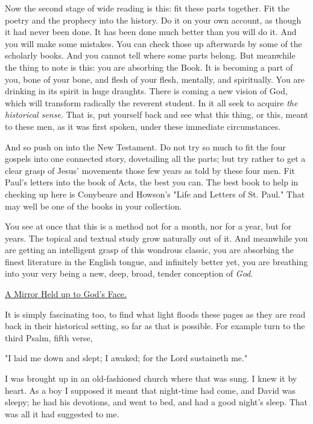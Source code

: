 Now the second stage of wide reading is this: fit these parts together.
Fit the poetry and the prophecy into the history. Do it on your own
account, as though it had never been done. It has been done much better
than you will do it. And you will make some mistakes. You can check those
up afterwards by some of the scholarly books. And you cannot tell where
some parts belong. But meanwhile the thing to note is this: you are
absorbing the Book. It is becoming a part of you, bone of your bone, and
flesh of your flesh, mentally, and spiritually. You are drinking in its
spirit in huge draughts. There is coming a new vision of God, which will
transform radically the reverent student. In it all seek to acquire \textit{the
historical sense}. That is, put yourself back and see what this thing, or
this, meant to these men, as it was first spoken, under these immediate
circumstances.

And so push on into the New Testament. Do not try so much to fit the four
gospels into one connected story, dovetailing all the parts; but try
rather to get a clear grasp of Jesus' movements those few years as told by
these four men. Fit Paul's letters into the book of Acts, the best you
can. The best book to help in checking up here is Conybeare and Howson's
"Life and Letters of St. Paul." That may well be one of the books in your
collection.

You see at once that this is a method not for a month, nor for a year, but
for years. The topical and textual study grow naturally out of it. And
meanwhile you are getting an intelligent grasp of this wondrous classic,
you are absorbing the finest literature in the English tongue, and
infinitely better yet, you are breathing into your very being a new, deep,
broad, tender conception of \textit{God}.



\underline{A Mirror Held up to God's Face.}


It is simply fascinating too, to find what light floods these pages as
they are read back in their historical setting, so far as that is
possible. For example turn to the third Psalm, fifth verse,

    "I laid me down and slept;
    I awaked; for the Lord sustaineth me."

I was brought up in an old-fashioned church where that was sung. I knew it
by heart. As a boy I supposed it meant that night-time had come, and David
was sleepy; he had his devotions, and went to bed, and had a good night's
sleep. That was all it had suggested to me.

